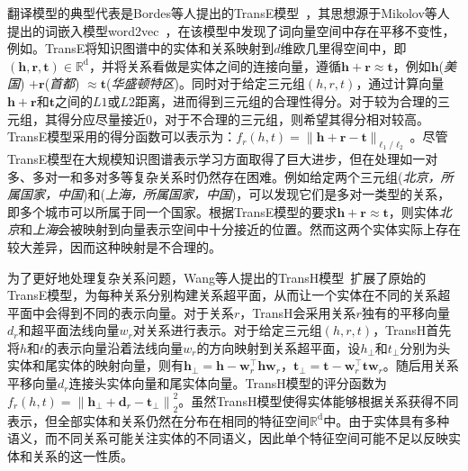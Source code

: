 \documentclass[algorithmlist, AutoFakeBold, AutoFakeSlant, figurelist, tablelist, nomlist, masters]{seuthesix}
\begin{document}
翻译模型的典型代表是Bordes等人提出的TransE模型~\cite{bordes2013translating}，其思想源于Mikolov等人提出的词嵌入模型word2vec~\cite{toms2013}，在该模型中发现了词向量空间中存在平移不变性，例如。TransE将知识图谱中的实体和关系映射到$d$维欧几里得空间中，即$\left(\bm{h}, \bm{r}, \bm{t}\right) \in \mathbb{R}^{\mathrm{d}}$，并将关系看做是实体之间的连接向量，遵循$\bm{h} + \bm{r} \approx \bm{t}$，例如$\bm{h}$(\textit{美国}) $+ \bm{r}$(\textit{首都}) $\approx \bm{t}$(\textit{华盛顿特区})。同时对于给定三元组$\left(h, r, t\right)$，通过计算向量$\bm{h} + \bm{r}$和$\bm{t}$之间的$L1$或$L2$距离，进而得到三元组的合理性得分。对于较为合理的三元组，其得分应尽量接近0，对于不合理的三元组，则希望其得分相对较高。TransE模型采用的得分函数可以表示为：$f_r(h, t) = \|\bm{h} + \bm{r} - \bm{t}\|_{\ell_1 / \ell_2}$。尽管TransE模型在大规模知识图谱表示学习方面取得了巨大进步，但在处理如一对多、多对一和多对多等复杂关系时仍然存在困难。例如给定两个三元组(\textit{北京，所属国家，中国})和(\textit{上海，所属国家，中国})，可以发现它们是多对一类型的关系，即多个城市可以所属于同一个国家。根据TransE模型的要求$\bm{h} + \bm{r} \approx \bm{t}$，则实体\textit{北京}和\textit{上海}会被映射到向量表示空间中十分接近的位置。然而这两个实体实际上存在较大差异，因而这种映射是不合理的。

为了更好地处理复杂关系问题，Wang等人提出的TransH模型~\cite{wang2014knowledge}扩展了原始的TransE模型，为每种关系分别构建关系超平面，从而让一个实体在不同的关系超平面中会得到不同的表示向量。对于关系$r$，TransH会采用关系$r$独有的平移向量$d_r$和超平面法线向量$w_r$对关系进行表示。对于给定三元组$\left(h, r, t\right)$，TransH首先将$h$和$t$的表示向量沿着法线向量$w_r$的方向映射到关系超平面，设$h_\perp$和$t_\perp$分别为头实体和尾实体的映射向量，则有$\bm{h}_{\perp} = \bm{h} - \bm{w}_r^{\top} \bm{h} \bm{w}_r$，$\bm{t}_{\perp} = \bm{t} - \bm{w}_r^{\top} \bm{t} \bm{w}_r$。随后用关系平移向量$d_r$连接头实体向量和尾实体向量。TransH模型的评分函数为$f_r(h, t) = \left\|\bm{h}_{\perp} + \bm{d}_r - \boldsymbol{t}_{\perp}\right\|_2^2$。虽然TransH模型使得实体能够根据关系获得不同表示，但全部实体和关系仍然在分布在相同的特征空间$\mathbb{R}^{\mathrm{d}}$中。由于实体具有多种语义，而不同关系可能关注实体的不同语义，因此单个特征空间可能不足以反映实体和关系的这一性质。
\end{document}
